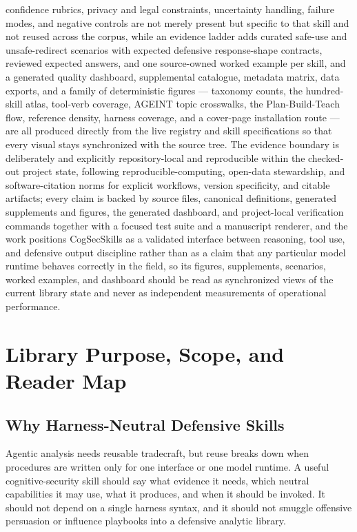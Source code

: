\documentclass[
]{article}
\begin{document}
confidence rubrics, privacy and legal constraints, uncertainty handling,
failure modes, and negative controls are not merely present but specific
to that skill and not reused across the corpus, while an evidence ladder
adds curated safe-use and unsafe-redirect scenarios with expected
defensive response-shape contracts, reviewed expected answers, and one
source-owned worked example per skill, and a generated quality
dashboard, supplemental catalogue, metadata matrix, data exports, and a
family of deterministic figures --- taxonomy counts, the hundred-skill
atlas, tool-verb coverage, AGEINT topic crosswalks, the Plan-Build-Teach
flow, reference density, harness coverage, and a cover-page installation
route --- are all produced directly from the live registry and skill
specifications so that every visual stays synchronized with the source
tree. The evidence boundary is deliberately and explicitly
repository-local and reproducible within the checked-out project state,
following reproducible-computing, open-data stewardship, and
software-citation norms for explicit workflows, version specificity, and
citable artifacts; every claim is backed by source files, canonical
definitions, generated supplements and figures, the generated dashboard,
and project-local verification commands together with a focused test
suite and a manuscript renderer, and the work positions CogSecSkills as
a validated interface between reasoning, tool use, and defensive output
discipline rather than as a claim that any particular model runtime
behaves correctly in the field, so its figures, supplements, scenarios,
worked examples, and dashboard should be read as synchronized views of
the current library state and never as independent measurements of
operational performance.

\newpage

\section{Library Purpose, Scope, and Reader Map}\label{sec:introduction}

\subsection{Why Harness-Neutral Defensive
Skills}\label{why-harness-neutral-defensive-skills}

Agentic analysis needs reusable tradecraft, but reuse breaks down when
procedures are written only for one interface or one model runtime. A
useful cognitive-security skill should say what evidence it needs, which
neutral capabilities it may use, what it produces, and when it should be
invoked. It should not depend on a single harness syntax, and it should
not smuggle offensive persuasion or influence playbooks into a defensive
analytic library.
\end{document}

